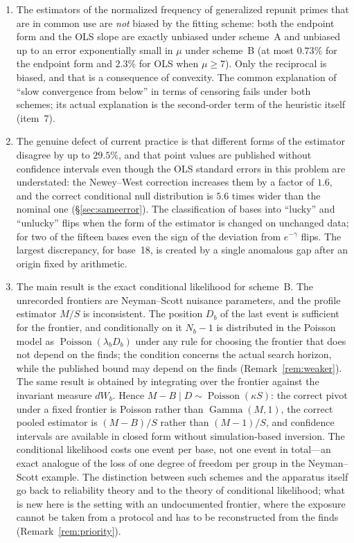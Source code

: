 \documentclass[11pt,a4paper]{article}
\theoremstyle{plain}
\theoremstyle{remark}
\newcommand{\emg}{e^{-\gamma}}
\DeclareMathOperator{\Gam}{Gamma}
\DeclareMathOperator{\Pois}{Poisson}
\begin{document}
\begin{enumerate}
\item The estimators of the normalized frequency of generalized repunit primes
that are in common use are \emph{not} biased by the fitting scheme: both the
endpoint form and the OLS slope are exactly unbiased under scheme~A and unbiased
up to an error exponentially small in $\mu$ under scheme~B (at most $0.73\%$ for
the endpoint form and $2.3\%$ for OLS when $\mu\ge7$). Only the reciprocal is
biased, and that is a consequence of convexity. The common explanation of ``slow
convergence from below'' in terms of censoring fails under both schemes; its
actual explanation is the second-order term of the heuristic itself (item~7).

\item The genuine defect of current practice is that different forms of the
estimator disagree by up to $29.5\%$, and that point values are published
without confidence intervals even though the OLS standard errors in this problem
are understated: the Newey--West correction increases them by a factor of $1.6$,
and the correct conditional null distribution is $5.6$ times wider than the
nominal one (\S\ref{sec:sameerror}). The classification of bases into ``lucky''
and ``unlucky'' flips when the form of the estimator is changed on unchanged
data; for two of the fifteen bases even the sign of the deviation from $\emg$
flips. The largest discrepancy, for base~18, is created by a single anomalous gap
after an origin fixed by arithmetic.

\item The main result is the exact conditional likelihood for scheme~B. The
unrecorded frontiers are Neyman--Scott nuisance parameters, and the profile
estimator $M/S$ is inconsistent. The position $D_b$ of the last event is
sufficient for the frontier, and conditionally on it $N_b-1$ is distributed in
the Poisson model as $\Pois(\lambda_bD_b)$ under any rule for choosing the
frontier that does not depend on the finds; the condition concerns the actual
search horizon, while the published bound may depend on the finds
(Remark~\ref{rem:weaker}). The same result is obtained by integrating over the
frontier against the invariant measure $dW_b$. Hence
$M-B\mid D\sim\Pois(\kappa S)$: the correct pivot under a fixed frontier is
Poisson rather than $\Gam(M,1)$, the correct pooled estimator is $(M-B)/S$
rather than $(M-1)/S$, and confidence intervals are available in closed form
without simulation-based inversion. The conditional likelihood costs one event
per base, not one event in total---an exact analogue of the loss of one degree
of freedom per group in the Neyman--Scott example. The distinction between such
schemes and the apparatus itself go back to reliability theory and to the theory
of conditional likelihood; what is new here is the setting with an undocumented
frontier, where the exposure cannot be taken from a protocol and has to be
reconstructed from the finds (Remark~\ref{rem:priority}).


\end{enumerate}
\end{document}
